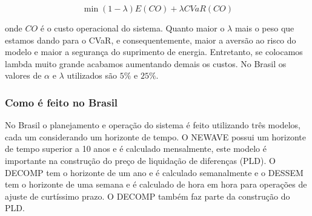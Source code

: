 \begin{equation}
\min (1-\lambda)E(CO) + \lambda CVaR(CO)
\end{equation}

onde $CO$ é o custo operacional do sistema. Quanto maior o $\lambda$ mais o peso que estamos dando para o CVaR, e consequentemente, maior a aversão ao risco do modelo e maior a segurança do suprimento de energia. Entretanto, se colocamos lambda muito grande acabamos aumentando demais os custos. No Brasil os valores de $\alpha$ e $\lambda$ utilizados são $5\%$ e $25\%$. 

\subsubsection{Como é feito no Brasil}

No Brasil o planejamento e operação do sistema é feito utilizando três modelos, cada um considerando um horizonte de tempo. O NEWAVE possui um horizonte de tempo superior a 10 anos e é calculado mensalmente, este modelo é importante na construção do preço de liquidação de diferenças (PLD). O DECOMP tem o horizonte de um ano e é calculado semanalmente e o DESSEM tem o horizonte de uma semana e é calculado de hora em hora para operações de ajuste de curtíssimo prazo. O DECOMP também faz parte da construção do PLD. 



